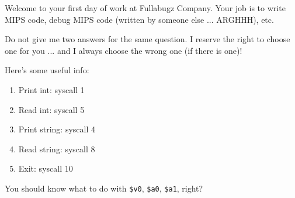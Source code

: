 Welcome to your first day of work at Fullabugz Company.
Your job is to write MIPS
code, debug MIPS code (written by someone else ... ARGHHH), etc.

%

Do not give me two answers for the same question.
I reserve the right to choose one
for you ...  and I always choose the wrong one (if there is one)!

Here's some useful info:
\begin{enumerate}[nosep]
\item Print int: syscall 1
\item Read int: syscall 5
\item Print string: syscall 4
\item Read string: syscall 8
\item Exit: syscall 10
\end{enumerate}
You should know what to do with \verb!$v0!, \verb!$a0!, \verb!$a1!, right?
\vspace{1cm}
